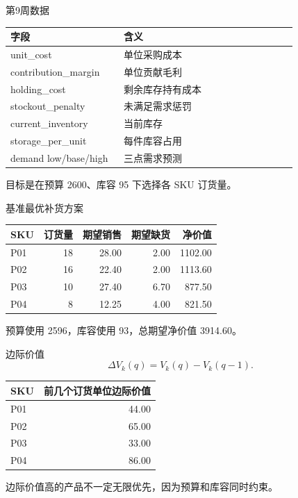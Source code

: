\documentclass[UTF8,fontset=fandol,aspectratio=169,11pt]{ctexbeamer}
\begin{document}
\begin{frame}{第9周数据}
\begin{center}
\begin{tabular}{p{0.30\linewidth}p{0.52\linewidth}}
\toprule
字段 & 含义\\
\midrule
unit\_cost & 单位采购成本\\
contribution\_margin & 单位贡献毛利\\
holding\_cost & 剩余库存持有成本\\
stockout\_penalty & 未满足需求惩罚\\
current\_inventory & 当前库存\\
storage\_per\_unit & 每件库容占用\\
demand low/base/high & 三点需求预测\\
\bottomrule
\end{tabular}
\end{center}
\small
目标是在预算 2600、库容 95 下选择各 SKU 订货量。
\end{frame}

\begin{frame}{基准最优补货方案}
\begin{center}
\begin{tabular}{lrrrr}
\toprule
SKU & 订货量 & 期望销售 & 期望缺货 & 净价值\\
\midrule
P01 & 18 & 28.00 & 2.00 & 1102.00\\
P02 & 16 & 22.40 & 2.00 & 1113.60\\
P03 & 10 & 27.40 & 6.70 & 877.50\\
P04 & 8 & 12.25 & 4.00 & 821.50\\
\bottomrule
\end{tabular}
\end{center}
\vspace{0.2cm}
\small
预算使用 2596，库容使用 93，总期望净价值 3914.60。
\end{frame}

\begin{frame}{边际价值}
\[
  \Delta V_k(q)=V_k(q)-V_k(q-1).
\]
\begin{center}
\begin{tabular}{lr}
\toprule
SKU & 前几个订货单位边际价值\\
\midrule
P01 & 44.00\\
P02 & 65.00\\
P03 & 33.00\\
P04 & 86.00\\
\bottomrule
\end{tabular}
\end{center}
\small
边际价值高的产品不一定无限优先，因为预算和库容同时约束。
\end{frame}
\end{document}
